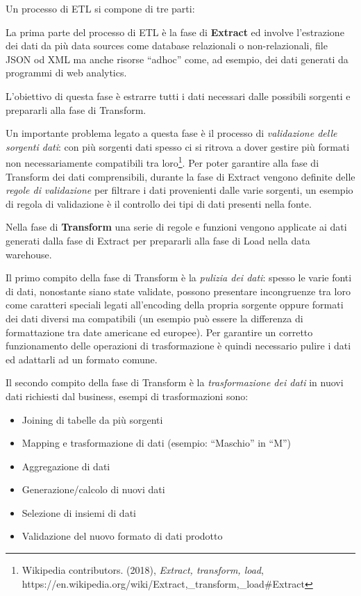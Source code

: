 \documentclass[]{article}
\providecommand{\tightlist}{%
  \setlength{\itemsep}{0pt}\setlength{\parskip}{0pt}}
\begin{document}
Un processo di ETL si compone di tre parti:

La prima parte del processo di ETL è la fase di \textbf{Extract} ed
involve l'estrazione dei dati da più data sources come database
relazionali o non-relazionali, file JSON od XML ma anche risorse
``adhoc'' come, ad esempio, dei dati generati da programmi di web
analytics.

L'obiettivo di questa fase è estrarre tutti i dati necessari dalle
possibili sorgenti e prepararli alla fase di Transform.

Un importante problema legato a questa fase è il processo di
\emph{validazione delle sorgenti dati}: con più sorgenti dati spesso ci
si ritrova a dover gestire più formati non necessariamente compatibili
tra loro\footnote{Wikipedia contributors. (2018), \emph{Extract,
  transform, load},\\
  https://en.wikipedia.org/wiki/Extract,\_transform,\_load\#Extract}.
Per poter garantire alla fase di Transform dei dati comprensibili,
durante la fase di Extract vengono definite delle \emph{regole di
validazione} per filtrare i dati provenienti dalle varie sorgenti, un
esempio di regola di validazione è il controllo dei tipi di dati
presenti nella fonte.

\newpage

Nella fase di \textbf{Transform} una serie di regole e funzioni vengono
applicate ai dati generati dalla fase di Extract per prepararli alla
fase di Load nella data warehouse.

Il primo compito della fase di Transform è la \emph{pulizia dei dati}:
spesso le varie fonti di dati, nonostante siano state validate, possono
presentare incongruenze tra loro come caratteri speciali legati
all'encoding della propria sorgente oppure formati dei dati diversi ma
compatibili (un esempio può essere la differenza di formattazione tra
date americane ed europee). Per garantire un corretto funzionamento
delle operazioni di trasformazione è quindi necessario pulire i dati ed
adattarli ad un formato comune.

Il secondo compito della fase di Transform è la \emph{trasformazione dei
dati} in nuovi dati richiesti dal business, esempi di trasformazioni
sono:

\begin{itemize}
\tightlist
\item
  Joining di tabelle da più sorgenti
\item
  Mapping e trasformazione di dati (esempio: ``Maschio'' in ``M'')
\item
  Aggregazione di dati
\item
  Generazione/calcolo di nuovi dati
\item
  Selezione di insiemi di dati
\item
  Validazione del nuovo formato di dati prodotto
\end{itemize}
\end{document}
